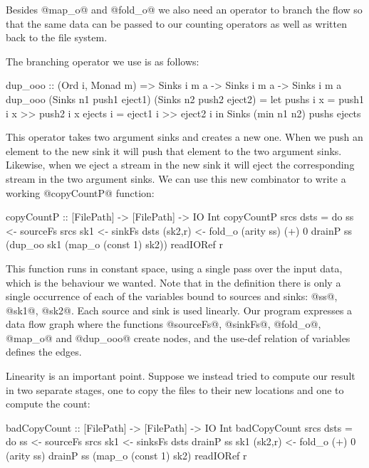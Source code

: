 Besides @map_o@ and @fold_o@ we also need an operator to branch the flow so that the same data can be passed to our counting operators as well as written back to the file system. 

\eject
The branching operator we use is as follows:

\begin{code}
dup_ooo :: (Ord i, Monad m)
       => Sinks i m a -> Sinks i m a -> Sinks i m a
dup_ooo (Sinks n1 push1 eject1) 
        (Sinks n2 push2 eject2)
 = let pushs  i x = push1 i x >> push2 i x
       ejects i   = eject1 i  >> eject2 i
   in  Sinks (min n1 n2) pushs ejects
\end{code}

This operator takes two argument sinks and creates a new one. When we push an element to the new sink it will push that element to the two argument sinks. Likewise, when we eject a stream in the new sink it will eject the corresponding stream in the two argument sinks. We can use this new combinator to write a working @copyCountP@ function:

\begin{code}
copyCountP :: [FilePath] -> [FilePath] -> IO Int
copyCountP srcs dsts
 = do  ss      <- sourceFs srcs
       sk1     <- sinkFs   dsts
       (sk2,r) <- fold_o  (arity ss) (+) 0 
       drainP ss (dup_oo sk1 (map_o (const 1) sk2))
       readIORef r
\end{code}

This function runs in constant space, using a single pass over the input data, which is the behaviour we wanted. Note that in the definition there is only a single occurrence of each of the variables bound to sources and sinks: @ss@, @sk1@, @sk2@. Each source and sink is used linearly. Our program expresses a data flow graph where the functions @sourceFs@, @sinkFs@, @fold_o@, @map_o@ and @dup_ooo@ create nodes, and the use-def relation of variables defines the edges.

\eject
Linearity is an important point. Suppose we instead tried to compute our result in two separate stages, one to copy the files to their new locations and one to compute the count:
\begin{code}
badCopyCount :: [FilePath] -> [FilePath] -> IO Int
badCopyCount srcs dsts
 = do  ss      <- sourceFs srcs
       sk1     <- sinksFs  dsts
       drainP ss sk1
       (sk2,r) <- fold_o (+) 0 (arity ss)
       drainP ss (map_o (const 1) sk2)
       readIORef r
\end{code}


